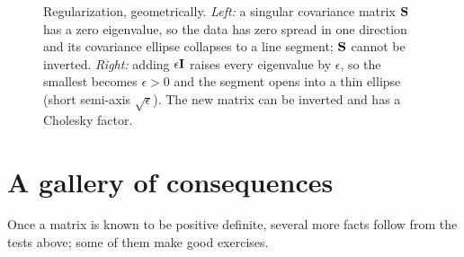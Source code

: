 \begin{figure}[htbp]
\centering
{}\hspace{1.2cm}
\caption{Regularization, geometrically. \emph{Left:} a singular covariance matrix $\mathbf{S}$ has a
zero eigenvalue, so the data has zero spread in one direction and its covariance ellipse collapses
to a line segment; $\mathbf{S}$ cannot be inverted. \emph{Right:} adding $\epsilon\mathbf{I}$ raises every
eigenvalue by $\epsilon$, so the smallest becomes $\epsilon>0$ and the segment opens into a thin
ellipse (short semi-axis $\sqrt{\epsilon}$). The new matrix can be inverted and has a Cholesky
factor.}
\label{ch27:fig-regularize}
\end{figure}

\section{A gallery of consequences}

Once a matrix is known to be positive definite, several more facts follow from the tests above;
some of them make good exercises.

